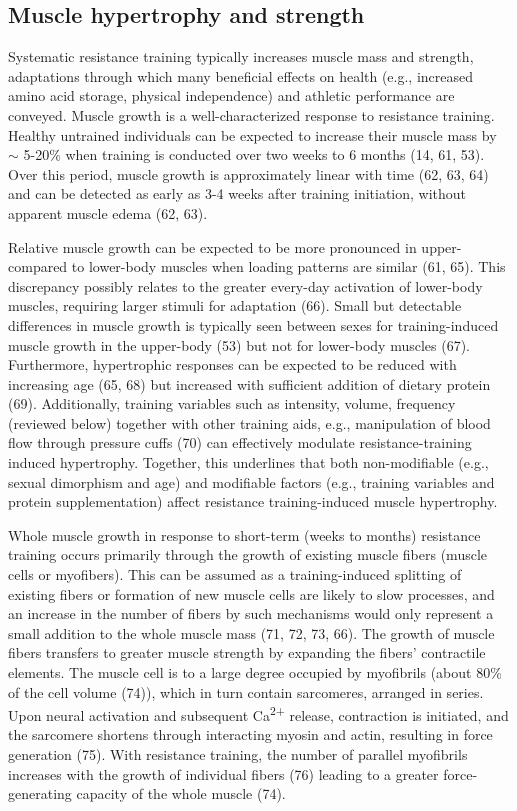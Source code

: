 \documentclass[twoside,10pt]{gihclass} %
\begin{document}
\hypertarget{muscle-hypertrophy-and-strength}{%
\subsection{Muscle hypertrophy and strength}\label{muscle-hypertrophy-and-strength}}

Systematic resistance training typically increases muscle mass and strength, adaptations through which many beneficial effects on health (e.g., increased amino acid storage, physical independence) and athletic performance are conveyed.
Muscle growth is a well-characterized response to resistance training.
Healthy untrained individuals can be expected to increase their muscle mass by \(\sim\) 5-20\% when training is conducted over two weeks to 6 months
(14, 61, 53).
Over this period, muscle growth is approximately linear with time
(62, 63, 64)
and can be detected as early as 3-4 weeks after training initiation, without apparent muscle edema
(62, 63).

Relative muscle growth can be expected to be more pronounced in upper- compared to lower-body muscles when loading patterns are similar
(61, 65).
This discrepancy possibly relates to the greater every-day activation of lower-body muscles, requiring larger stimuli for adaptation
(66).
Small but detectable differences in muscle growth is typically seen between sexes for training-induced muscle growth in the upper-body
(53)
but not for lower-body muscles
(67).
Furthermore, hypertrophic responses can be expected to be reduced with increasing age
(65, 68)
but increased with sufficient addition of dietary protein
(69).
Additionally, training variables such as intensity, volume, frequency (reviewed below) together with other training aids, e.g., manipulation of blood flow through pressure cuffs
(70)
can effectively modulate resistance-training induced hypertrophy.
Together, this underlines that both non-modifiable (e.g., sexual dimorphism and age) and modifiable factors (e.g., training variables and protein supplementation) affect resistance training-induced muscle hypertrophy.

Whole muscle growth in response to short-term (weeks to months) resistance training occurs primarily through the growth of existing muscle fibers (muscle cells or myofibers).
This can be assumed as a training-induced splitting of existing fibers or formation of new muscle cells are likely to slow processes, and an increase in the number of fibers by such mechanisms would only represent a small addition to the whole muscle mass
(71, 72, 73, 66).
The growth of muscle fibers transfers to greater muscle strength by expanding the fibers' contractile elements.
The muscle cell is to a large degree occupied by myofibrils
(about 80\% of the cell volume
(74)),
which in turn contain sarcomeres, arranged in series.
Upon neural activation and subsequent Ca\textsuperscript{2+} release, contraction is initiated, and the sarcomere shortens through interacting myosin and actin, resulting in force generation
(75).
With resistance training, the number of parallel myofibrils increases with the growth of individual fibers
(76)
leading to a greater force-generating capacity of the whole muscle
(74).
\end{document}
